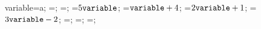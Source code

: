 \documentclass[exercice]{thedocument}%
\begin{document}
%
    \>variable=a;%
    =;%
    =;%
    =$5{\<variable;}$;%
    =${\<variable;}+4$;%
    =$2{\<variable;}+1$;%
    =$3{\<variable;}-2$;%
    =;%
    =;%
    =;%
\end{document}
